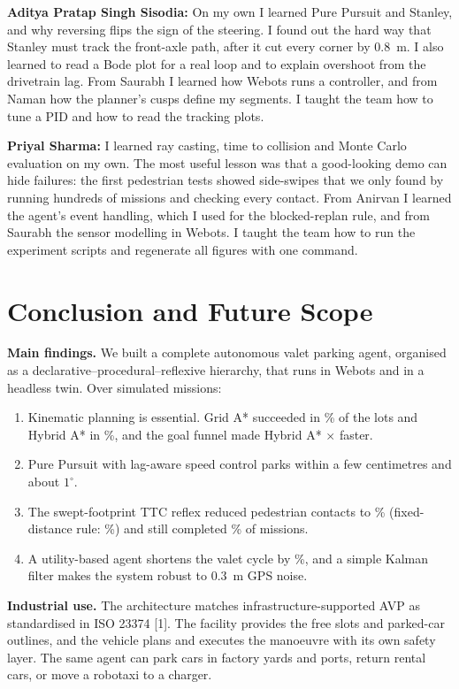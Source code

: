 \documentclass[12pt,a4paper]{article}
\newcommand{\member}[1]{\textbf{#1}}
\begin{document}
\member{Aditya Pratap Singh Sisodia:} On my own I learned Pure Pursuit and Stanley, and why reversing flips the sign of the steering. I found out the hard way that Stanley must track the front-axle path, after it cut every corner by 0.8~m. I also learned to read a Bode plot for a real loop and to explain overshoot from the drivetrain lag. From Saurabh I learned how Webots runs a controller, and from Naman how the planner's cusps define my segments. I taught the team how to tune a PID and how to read the tracking plots.

\member{Priyal Sharma:} I learned ray casting, time to collision and Monte Carlo evaluation on my own. The most useful lesson was that a good-looking demo can hide failures: the first pedestrian tests showed side-swipes that we only found by running hundreds of missions and checking every contact. From Anirvan I learned the agent's event handling, which I used for the blocked-replan rule, and from Saurabh the sensor modelling in Webots. I taught the team how to run the experiment scripts and regenerate all figures with one command.

\section{Conclusion and Future Scope}
\textbf{Main findings.} We built a complete autonomous valet parking agent, organised as a declarative--procedural--reflexive hierarchy, that runs in Webots and in a headless twin. Over \NMissions{} simulated missions:
\begin{enumerate}[itemsep=1pt,topsep=2pt]
\item Kinematic planning is essential. Grid A* succeeded in \EOneSuccGrid\% of the lots and Hybrid A* in \EOneSuccFunnel\%, and the goal funnel made Hybrid A* \EOneTimeRatio$\times$ faster.
\item Pure Pursuit with lag-aware speed control parks within a few centimetres and about $1^\circ$.
\item The swept-footprint TTC reflex reduced pedestrian contacts to \EThreeCollTTC\% (fixed-distance rule: \EThreeCollFixed\%) and still completed \EThreeSuccTTC\% of missions.
\item A utility-based agent shortens the valet cycle by \EFourCycleGain\%, and a simple Kalman filter makes the system robust to 0.3~m GPS noise.
\end{enumerate}

\textbf{Industrial use.} The architecture matches infrastructure-supported AVP as standardised in ISO 23374 [1]. The facility provides the free slots and parked-car outlines, and the vehicle plans and executes the manoeuvre with its own safety layer. The same agent can park cars in factory yards and ports, return rental cars, or move a robotaxi to a charger.
\end{document}
